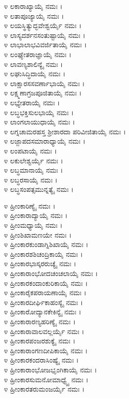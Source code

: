 
೪ ಲಕಾರಾಖ್ಯಾಯೈ ನಮಃ ।\\
೪ ಲತಾಪೂಜ್ಯಾಯೈ ನಮಃ ।\\
೪ ಲಯಸ್ಥಿತ್ಯುದ್ಭವೇಶ್ವರ್ಯೈ ನಮಃ ।\\
೪ ಲಾಸ್ಯದರ್ಶನಸಂತುಷ್ಟಾಯೈ ನಮಃ ।\\
೪ ಲಾಭಾಲಾಭವಿವರ್ಜಿತಾಯೈ ನಮಃ ।\\
೪ ಲಂಘ್ಯೇತರಾಜ್ಞಾಯೈ ನಮಃ ।\\
೪ ಲಾವಣ್ಯಶಾಲಿನ್ಯೈ ನಮಃ ।\\
೪ ಲಘುಸಿದ್ಧಿದಾಯೈ ನಮಃ ।\\
೪ ಲಾಕ್ಷಾರಸಸವರ್ಣಾಭಾಯೈ ನಮಃ ।\\
೪ ಲಕ್ಷ್ಮಣಾಗ್ರಜಪೂಜಿತಾಯೈ ನಮಃ ।\\
೪ ಲಭ್ಯೇತರಾಯೈ ನಮಃ ।\\
೪ ಲಬ್ಧಭಕ್ತಿಸುಲಭಾಯೈ ನಮಃ ।\\
೪ ಲಾಂಗಲಾಯುಧಾಯೈ ನಮಃ ।\\
೪ ಲಗ್ನಚಾಮರಹಸ್ತ ಶ್ರೀಶಾರದಾ ಪರಿವೀಜಿತಾಯೈ ನಮಃ ।\\
೪ ಲಜ್ಜಾಪದಸಮಾರಾಧ್ಯಾಯೈ ನಮಃ ।\\
೪ ಲಂಪಟಾಯೈ ನಮಃ ।\\
೪ ಲಕುಲೇಶ್ವರ್ಯೈ ನಮಃ ।\\
೪ ಲಬ್ಧಮಾನಾಯೈ ನಮಃ ।\\
೪ ಲಬ್ಧರಸಾಯೈ ನಮಃ ।\\
೪ ಲಬ್ಧಸಂಪತ್ಸಮುನ್ನತ್ಯೈ ನಮಃ ।


೪ ಹ್ರೀಂಕಾರಿಣ್ಯೈ ನಮಃ ।\\
೪ ಹ್ರೀಂಕಾರಾದ್ಯಾಯೈ ನಮಃ ।\\
೪ ಹ್ರೀಂಮಧ್ಯಾಯೈ ನಮಃ ।\\
೪ ಹ್ರೀಂಶಿಖಾಮಣಯೇ ನಮಃ ।\\
೪ ಹ್ರೀಂಕಾರಕುಂಡಾಗ್ನಿಶಿಖಾಯೈ ನಮಃ ।\\
೪ ಹ್ರೀಂಕಾರಶಶಿಚಂದ್ರಿಕಾಯೈ ನಮಃ ।\\
೪ ಹ್ರೀಂಕಾರಭಾಸ್ಕರರುಚ್ಯೈ ನಮಃ ।\\
೪ ಹ್ರೀಂಕಾರಾಂಭೋದಚಂಚಲಾಯೈ ನಮಃ ।\\
೪ ಹ್ರೀಂಕಾರಕಂದಾಂಕುರಿಕಾಯೈ ನಮಃ ।\\
೪ ಹ್ರೀಂಕಾರೈಕಪರಾಯಣಾಯೈ ನಮಃ ।\\
೪ ಹ್ರೀಂಕಾರದೀರ್ಘಿಕಾಹಂಸ್ಯೈ ನಮಃ ।\\
೪ ಹ್ರೀಂಕಾರೋದ್ಯಾನಕೇಕಿನ್ಯೈ ನಮಃ ।\\
೪ ಹ್ರೀಂಕಾರಾರಣ್ಯಹರಿಣ್ಯೈ ನಮಃ ।\\
೪ ಹ್ರೀಂಕಾರಾವಾಲವಲ್ಲರ್ಯೈ ನಮಃ ।\\
೪ ಹ್ರೀಂಕಾರಪಂಜರಶುಕ್ಯೈ ನಮಃ ।\\
೪ ಹ್ರೀಂಕಾರಾಂಗಣದೀಪಿಕಾಯೈ ನಮಃ ।\\
೪ ಹ್ರೀಂಕಾರಕಂದರಾಸಿಂಹ್ಯೈ ನಮಃ ।\\
೪ ಹ್ರೀಂಕಾರಾಂಭೋಜಭೃಂಗಿಕಾಯೈ ನಮಃ ।\\
೪ ಹ್ರೀಂಕಾರಸುಮನೋಮಾಧ್ವ್ಯೈ ನಮಃ ।\\
೪ ಹ್ರೀಂಕಾರತರುಮಂಜರ್ಯೈ ನಮಃ ।

